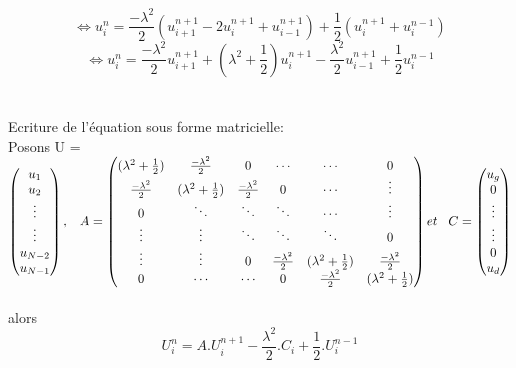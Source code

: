 \begin{equation*}
\Leftrightarrow u^{n}_{i} = \frac{-\lambda ^2}{2} (u^{n+1}_{i+1} - 2u^{n+1}_{i} + u^{n+1}_{i-1}) + \frac{1}{2} (u^{n+1}_{i} + u^{n-1}_{i})
\end{equation*}
\begin{equation*}
\Leftrightarrow
\boxed{
u^{n}_{i} = \frac{-\lambda ^2}{2}u^{n+1}_{i+1} + (\lambda^2 + \frac{1}{2})u^{n+1}_{i} - \frac{\lambda ^2}{2}u^{n+1}_{i-1} + \frac{1}{2} u^{n-1}_{i}}
\end{equation*} \\\\
Ecriture de l'équation sous forme matricielle: \vspace{3 mm}\\

Posons U = 
\begin{math}
\begin{pmatrix}
u_{1}\\
u_{2}\\
\vdots \\
\vdots \\
u_{N-2}\\
u_{N-1}
\end{pmatrix}
, \hspace{3 mm} A = 
\begin{pmatrix}
(\lambda ^2 + \frac{1}{2}) & \frac{-\lambda ^2}{2} & 0 & \cdots & \cdots & 0\\
\frac{-\lambda ^2}{2} & (\lambda ^2 + \frac{1}{2}) & \frac{-\lambda ^2}{2} & 0 & \cdots & \vdots\\
0 & \ddots & \ddots & \ddots & \cdots & \vdots\\
\vdots & \vdots & \ddots & \ddots & \ddots & 0\\
\vdots & \vdots & 0 &\frac{-\lambda ^2}{2} & (\lambda ^2 + \frac{1}{2}) & \frac{-\lambda ^2}{2} \\
0 & \cdots & \cdots & 0 & \frac{-\lambda ^2}{2} & (\lambda ^2 + \frac{1}{2})
\end{pmatrix}
et \hspace{3 mm} C = 
\begin{pmatrix}
u_{g}\\
0 \\
\vdots \\
\vdots \\
0 \\
u_{d}
\end{pmatrix}
\end{math}\\\\
alors
\begin{equation*}
U^{n}_i = A.U^{n+1}_i - \frac{\lambda^2}{2}.C_i+\frac{1}{2}.U^{n-1}_i
\end{equation*}

